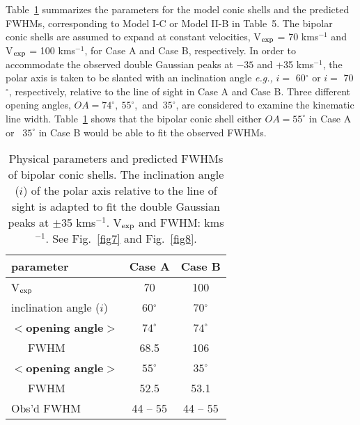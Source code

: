 \documentclass[a4paper,fleqn,usenatbib,useAMS]{mnras}
\def\eg{{\it e.g.,} }
\def\kms{km\hspace{1pt}s$^{-1}$}
\begin{document}
{{Table~\ref{tb7} summarizes the parameters for the model conic shells and the predicted FWHMs, corresponding to Model I-C or Model II-B in Table~5.
The bipolar conic shells are assumed to expand at constant velocities, V$_{\rm exp}$  =  70 {\kms} and V$_{\rm exp}$ = 100 {\kms}, for Case A and Case B, respectively.
In order to accommodate the observed double Gaussian peaks at $-35$ and +35 {\kms}, the polar axis is taken to be slanted with an inclination angle \eg  $i =$ 60$^{\circ}$ or  $i =$ 70$^{\circ}$, respectively, relative to the line of sight in Case A and Case B.
Three different opening angles, $OA = 74^{\circ},~ 55^{\circ}$,~and~$35^{\circ}$, are considered to examine the kinematic line width.
Table~\ref{tb7} shows that the bipolar conic shell either $OA = 55^{\circ}$ in Case A or ~$35^{\circ}$  in Case B would be able to fit the observed FWHMs.



\begin{table}
\caption{Physical parameters and predicted FWHMs of bipolar conic shells.
The inclination angle ($i$) of the polar axis relative to the line of sight is adapted to fit the double Gaussian peaks at $\pm$35 {\kms}. V$_{\rm exp}$ and FWHM: {\kms}.
See Fig.~\ref{fig7} and Fig.~\ref{fig8}.}
\vspace{-0.5cm}
\begin{tabular}{lcc}\\
\hline \hline

parameter & Case A & Case B \\

\hline
V$_{\rm exp}$   &  70   & 100  \\
inclination angle ($i$) &   60$^\circ$ &  70$^\circ$ \\
\hline
{\bf $<$opening angle$>$  }  & {\bf $74^{\circ}$  } &  {\bf $74^{\circ}$ } \\
~~~FWHM   & 68.5    &  106   \\
\hline
{\bf $<$opening angle$>$  }  & {\bf $55^{\circ}$  }  &  {\bf $35^{\circ}$ } \\
~~~FWHM     &  52.5   &   53.1   \\
\hline
Obs'd FWHM   &  44 -- 55  & 44 -- 55  \\
\hline

\end{tabular} \\
\label{tb7}
\end{table}



}}
\end{document}

